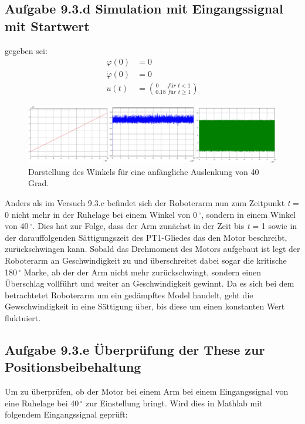 \documentclass[10pt]{scrartcl}
\begin{document}
\subsection{Aufgabe 9.3.d Simulation mit Eingangssignal mit Startwert}
gegeben sei:
\begin{align}
\varphi  (0) &= 0 \\
\dot \varphi (0) &= 0 \\
u(t)  &= \binom{0\,\,\,\,\,\,\,\,\, für\,\, t<1}{0.18\,\, für\,\, t \geq 1}
\end{align}

\begin{figure}[H]
	\centering
	\includegraphics[width=1.2\textwidth]{Theoretischer Teil/Aufgabe9c.png}
	\caption{Darstellung des Winkels für eine anfängliche Auslenkung von 40 Grad. }
	\label{img:grafik-dummy}
\end{figure}

Anders als im Versuch 9.3.c befindet sich der Roboterarm nun zum Zeitpunkt \textit t = 0 nicht mehr in der Ruhelage bei einem Winkel von 0\,$^\circ$, 
sondern in einem Winkel von 40\,$^\circ$. Dies hat zur Folge, dass der Arm zunächst in der Zeit bis  \textit t = 1 sowie in der darauffolgenden Sättigungszeit des PT1-Gliedes das den Motor beschreibt, zurückschwingen kann.
Sobald das Drehmoment des Motors aufgebaut ist legt der Roboterarm an Geschwindigkeit zu und überschreitet dabei sogar die kritische 180\,$^\circ$
Marke, ab der der Arm nicht mehr zurückschwingt, sondern einen Überschlag vollführt und weiter an Geschwindigkeit gewinnt.
Da es sich bei dem betrachtetet Roboterarm um ein gedämpftes Model handelt, geht die Gewschwindigkeit in eine Sättigung über, bis diese um
einen konstanten Wert fluktuiert. 




\subsection{Aufgabe 9.3.e Überprüfung der These zur Positionsbeibehaltung}

Um zu überprüfen, ob der Motor bei einem Arm bei einem Eingangssignal von eine Ruhelage bei 40\,$^\circ$ zur Einstellung bringt. Wird dies in Mathlab mit folgendem Eingangssignal geprüft:
\end{document}
